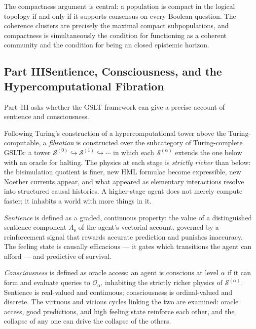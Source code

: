 \documentclass[12pt]{article}
\theoremstyle{remark}
\newcommand{\GSLT}{\mathcal{S}}
\newcommand{\sent}{A_{\mathrm{s}}}
\newcommand{\oracle}{\mathcal{O}}
\newcommand{\fiber}[1]{\GSLT^{(#1)}}
\begin{document}
The compactness argument is central: a population is compact in
the logical topology if and only if it supports consensus on every
Boolean question.
The coherence clusters are precisely the maximal compact
subpopulations, and compactness is simultaneously the condition
for functioning as a coherent community and the condition for
being an closed epistemic horizon.

\bigskip

\subsection*{Part III\quad Sentience, Consciousness, and the
Hypercomputational Fibration}

Part~III asks whether the GSLT framework can give a precise account
of sentience and consciousness.

Following Turing's construction of a hypercomputational tower above
the Turing-computable, a \emph{fibration} is constructed over the
subcategory of Turing-complete GSLTs: a tower
$\fiber{0} \hookrightarrow \fiber{1} \hookrightarrow \cdots$
in which each $\fiber{\alpha}$ extends the one below with an oracle
for halting.
The physics at each stage is \emph{strictly richer} than below:
the bisimulation quotient is finer, new HML formulae become
expressible, new Noether currents appear, and what appeared as
elementary interactions resolve into structured causal histories.
A higher-stage agent does not merely compute faster; it inhabits
a world with more things in it.

\emph{Sentience} is defined as a graded, continuous property: the
value of a distinguished sentience component $\sent$ of the
agent's vectorial account, governed by a reinforcement signal
that rewards accurate prediction and punishes inaccuracy.
The feeling state is causally efficacious --- it gates which
transitions the agent can afford --- and predictive of survival.

\emph{Consciousness} is defined as oracle access: an agent is
conscious at level $\alpha$ if it can form and evaluate queries
to $\oracle_\alpha$, inhabiting the strictly richer physics of
$\fiber{\alpha}$.
Sentience is real-valued and continuous; consciousness is
ordinal-valued and discrete.
The virtuous and vicious cycles linking the two are examined:
oracle access, good predictions, and high feeling state reinforce
each other, and the collapse of any one can drive the collapse
of the others.

\bigskip
\end{document}
